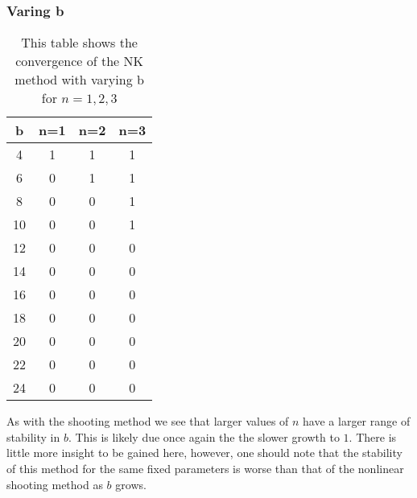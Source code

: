 \documentclass{article}
\begin{document}
\subsubsection{Varing b}
\begin{table}[H]
\centering
\begin{tabular}{|c|c|c|c|}
\hline
b & n=1 & n=2 & n=3\\
\hline
4  & 1 & 1 & 1\\
6  & 0 & 1 & 1\\
8  & 0 & 0 & 1\\
10 & 0 & 0 & 1\\
12 & 0 & 0 & 0\\
14 & 0 & 0 & 0\\
16 & 0 & 0 & 0\\
18 & 0 & 0 & 0\\
20 & 0 & 0 & 0\\
22 & 0 & 0 & 0\\
24 & 0 & 0 & 0\\
\hline
\end{tabular}
\caption{This table shows the convergence of the NK method with varying b for $n=1,2,3$}
\end{table}
As with the shooting method we see that larger values of $n$ have a larger range of stability in $b$. This is likely due once again the the slower growth to $1$. There is little more insight to be gained here, however, one should note that the stability of this method for the same fixed parameters is worse than that of the nonlinear shooting method as $b$ grows. 
\end{document}
